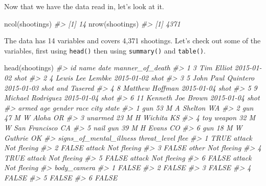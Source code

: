 \documentclass[
]{krantz}
\makeatletter
\newenvironment{Shaded}{\begin{snugshade}}{\end{snugshade}}
\newcommand{\CommentTok}[1]{\textcolor[rgb]{0.37,0.37,0.37}{\textit{#1}}}
\newcommand{\FunctionTok}[1]{\textcolor[rgb]{0,0,0}{#1}}
\newcommand{\NormalTok}[1]{#1}
\newenvironment{kframe}{%
\medskip{}
\setlength{\fboxsep}{.8em}
 \def\at@end@of@kframe{}%
 \ifinner\ifhmode%
  \def\at@end@of@kframe{\end{minipage}}%
  \begin{minipage}{\columnwidth}%
 \fi\fi%
 \def\FrameCommand##1{\hskip\@totalleftmargin \hskip-\fboxsep
 \colorbox{shadecolor}{##1}\hskip-\fboxsep
     \hskip-\linewidth \hskip-\@totalleftmargin \hskip\columnwidth}%
 \MakeFramed {\advance\hsize-\width
   \@totalleftmargin\z@ \linewidth\hsize
   \@setminipage}}%
 {\par\unskip\endMakeFramed%
 \at@end@of@kframe}
\renewenvironment{Shaded}{\begin{kframe}}{\end{kframe}}
\makeatother
\begin{document}
Now that we have the data read in, let's look at it.

\begin{Shaded}
\begin{Highlighting}[]
\FunctionTok{ncol}\NormalTok{(shootings)}
\CommentTok{\#\textgreater{} [1] 14}
\FunctionTok{nrow}\NormalTok{(shootings)}
\CommentTok{\#\textgreater{} [1] 4371}
\end{Highlighting}
\end{Shaded}

The data has 14 variables and covers 4,371 shootings. Let's
check out some of the variables, first using \texttt{head()}
then using \texttt{summary()} and \texttt{table()}.

\begin{Shaded}
\begin{Highlighting}[]
\FunctionTok{head}\NormalTok{(shootings)}
\CommentTok{\#\textgreater{}   id               name       date  manner\_of\_death}
\CommentTok{\#\textgreater{} 1  3         Tim Elliot 2015{-}01{-}02             shot}
\CommentTok{\#\textgreater{} 2  4   Lewis Lee Lembke 2015{-}01{-}02             shot}
\CommentTok{\#\textgreater{} 3  5 John Paul Quintero 2015{-}01{-}03 shot and Tasered}
\CommentTok{\#\textgreater{} 4  8    Matthew Hoffman 2015{-}01{-}04             shot}
\CommentTok{\#\textgreater{} 5  9  Michael Rodriguez 2015{-}01{-}04             shot}
\CommentTok{\#\textgreater{} 6 11  Kenneth Joe Brown 2015{-}01{-}04             shot}
\CommentTok{\#\textgreater{}        armed age gender race          city state}
\CommentTok{\#\textgreater{} 1        gun  53      M    A       Shelton    WA}
\CommentTok{\#\textgreater{} 2        gun  47      M    W         Aloha    OR}
\CommentTok{\#\textgreater{} 3    unarmed  23      M    H       Wichita    KS}
\CommentTok{\#\textgreater{} 4 toy weapon  32      M    W San Francisco    CA}
\CommentTok{\#\textgreater{} 5   nail gun  39      M    H         Evans    CO}
\CommentTok{\#\textgreater{} 6        gun  18      M    W       Guthrie    OK}
\CommentTok{\#\textgreater{}   signs\_of\_mental\_illness threat\_level        flee}
\CommentTok{\#\textgreater{} 1                    TRUE       attack Not fleeing}
\CommentTok{\#\textgreater{} 2                   FALSE       attack Not fleeing}
\CommentTok{\#\textgreater{} 3                   FALSE        other Not fleeing}
\CommentTok{\#\textgreater{} 4                    TRUE       attack Not fleeing}
\CommentTok{\#\textgreater{} 5                   FALSE       attack Not fleeing}
\CommentTok{\#\textgreater{} 6                   FALSE       attack Not fleeing}
\CommentTok{\#\textgreater{}   body\_camera}
\CommentTok{\#\textgreater{} 1       FALSE}
\CommentTok{\#\textgreater{} 2       FALSE}
\CommentTok{\#\textgreater{} 3       FALSE}
\CommentTok{\#\textgreater{} 4       FALSE}
\CommentTok{\#\textgreater{} 5       FALSE}
\CommentTok{\#\textgreater{} 6       FALSE}
\end{Highlighting}
\end{Shaded}
\end{document}
